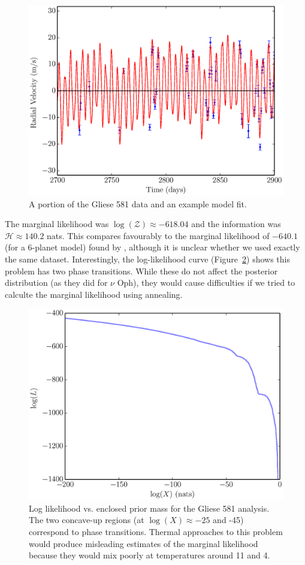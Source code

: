 \documentclass[useAMS,usenatbib]{mn2e}
\begin{document}
\begin{figure}
\includegraphics[scale=0.45]{Figures/gliese581.eps}
\caption{A portion of the Gliese 581 data and an example model fit.
\label{fig:gliese581}}
\end{figure}


The marginal likelihood was $\log(\mathcal{Z}) \approx -618.04$ and the
information was $\mathcal{H} \approx 140.2$ nats. This compares favourably
to the marginal likelihood of $-640.1$ (for a 6-planet model)
found by \citet{fengji}, although it is unclear whether we used exactly the
same dataset.
Interestingly, the log-likelihood curve (Figure~\ref{fig:logl})
shows this problem has two phase transitions. While these do not affect the
posterior distribution (as they did for $\nu$ Oph), they would cause difficulties
if we tried to calculte the marginal likelihood using annealing.

\begin{figure}
\includegraphics[scale=0.45]{Figures/logl.eps}
\caption{Log likelihood vs. enclosed prior mass for the Gliese 581 analysis.
The two concave-up regions (at $\log(X) \approx -25$ and -45) correspond to
phase transitions. Thermal approaches to this problem would produce misleading
estimates of the marginal likelihood because they would mix poorly at temperatures
around 11 and 4.
\label{fig:logl}}
\end{figure}
\end{document}
